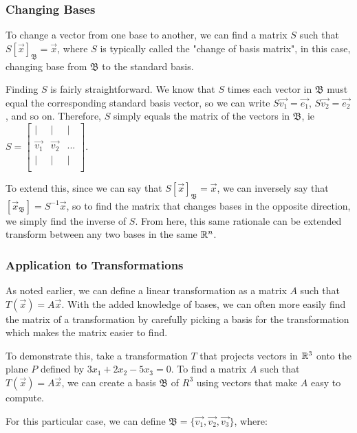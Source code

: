 \documentclass[12pt]{article}
\begin{document}
\subsubsection{Changing Bases}

To change a vector from one base to another, we can find a matrix $S$ such that $S[\vec{x}]_{\mathfrak{B}} = \vec{x}$, where $S$ is typically called the "change of basis matrix", in this case, changing base from $\mathfrak{B}$ to the standard basis.

Finding $S$ is fairly straightforward. We know that $S$ times each vector in $\mathfrak{B}$ must equal the corresponding standard basis vector, so we can write $S\vec{v_1} = \vec{e_1}$, $S\vec{v_2} = \vec{e_2}$, and so on. Therefore, $S$ simply equals the matrix of the vectors in $\mathfrak{B}$, ie $S = \begin{bmatrix}
    | & | & |\\
    \vec{v_1} & \vec{v_2} & ...\\
    | & | & |\\
\end{bmatrix}$.

To extend this, since we can say that $S[\vec{x}]_{\mathfrak{B}} = \vec{x}$, we can inversely say that $[\vec{x}_{\mathfrak{B}}] = S^{-1}\vec{x}$, so to find the matrix that changes bases in the opposite direction, we simply find the inverse of $S$. From here, this same rationale can be extended transform between any two bases in the same $\mathbb{R}^{n}$.

\subsubsection{Application to Transformations}

As noted earlier, we can define a linear transformation as a matrix $A$ such that $T(\vec{x}) = A\vec{x}$. With the added knowledge of bases, we can often more easily find the matrix of a transformation by carefully picking a basis for the transformation which makes the matrix easier to find.

To demonstrate this, take a transformation $T$ that projects vectors in $\mathbb{R}^{3}$ onto the plane $P$ defined by $3x_1+2x_2-5x_3=0$. To find a matrix $A$ such that $T(\vec{x}) = A\vec{x}$, we can create a basis $\mathfrak{B}$ of $R^{3}$ using vectors that make $A$ easy to compute.


For this particular case, we can define $\mathfrak{B} = \{\vec{v_1}, \vec{v_2}, \vec{v_3}\}$, where:
\end{document}
